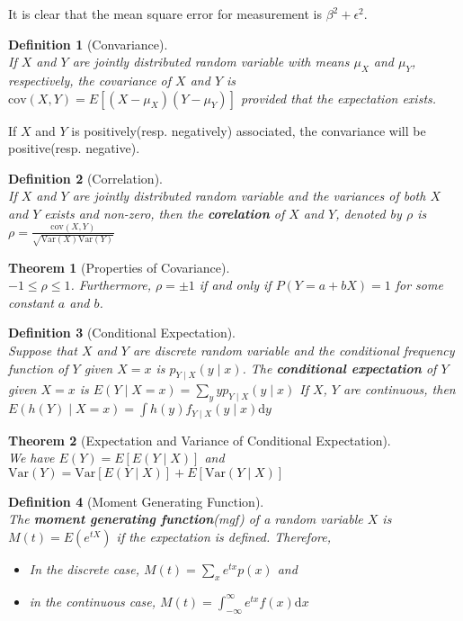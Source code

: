 \documentclass[12pt]{article}
\newcommand{\diff}{\mathrm{d}}
\newcommand{\var}{\mathrm{Var}}
\newcommand{\cov}{\mathrm{cov}}
\newtheorem{definition}{Definition}[section]
\newtheorem{theorem}{Theorem}[section]
\theoremstyle{definition}
\begin{document}
It is clear that the mean square error for measurement is $\beta^2+\epsilon^2$.
\begin{definition}[Convariance]
\hfill\\\normalfont If $X$ and $Y$ are jointly distributed random variable with means $\mu_X$ and $\mu_Y$, respectively, the covariance of $X$ and $Y$ is
$
\cov(X,Y) = E[(X-\mu_X)(Y-\mu_Y)]
$
provided that the expectation exists.
\end{definition}
If $X$ and $Y$ is positively(resp. negatively) associated, the convariance will be positive(resp. negative).
\begin{definition}[Correlation]
\hfill\\\normalfont If $X$ and $Y$ are jointly distributed random variable and the variances of both $X$ and $Y$ exists and non-zero, then the \textbf{corelation} of $X$ and $Y$, denoted by $\rho$  is
$
\rho = \frac{\cov(X,Y)}{\sqrt{\var(X)\var(Y)}}
$
\end{definition}
\begin{theorem}[Properties of Covariance]
\hfill\\\normalfont $-1\leq \rho\leq 1$. Furthermore, $\rho = \pm 1$ if and only if $P(Y=a+bX)=1$ for some constant $a$ and $b$.
\end{theorem}
\begin{definition}[Conditional Expectation]
\hfill\\\normalfont Suppose that $X$ and $Y$ are discrete random variable and the conditional frequency function of $Y$ given $X=x$ is $p_{Y\mid X}(y\mid x)$. The \textbf{conditional expectation} of $Y$ given $X=x$ is
$
E(Y\mid X=x) = \sum_y y p_{Y\mid X}(y\mid x)
$
If $X$, $Y$ are continuous, then
$
E(h(Y)\mid X=x) = \int h(y) f_{Y\mid X}(y\mid x)\diff y
$
\end{definition}
\begin{theorem}[Expectation and Variance of Conditional Expectation]
\hfill\\\normalfont We have
$
E(Y) = E[E(Y\mid X)]
$
and
$
\var(Y) = \var[E(Y\mid X)] + E[\var(Y\mid X)]
$
\end{theorem}
\begin{definition}[Moment Generating Function]
\hfill\\\normalfont The \textbf{moment generating function}(mgf) of a random variable $X$ is $M(t) = E(e^{tX})$ if the expectation is defined. Therefore,
\begin{itemize}
  \item In the discrete case, $M(t) = \sum_x e^{tx}p(x)$ and 
  \item in the continuous case, $M(t) = \int_{-\infty}^\infty e^{tx}f(x)\diff x$
\end{itemize}
\end{definition}
\end{document}
